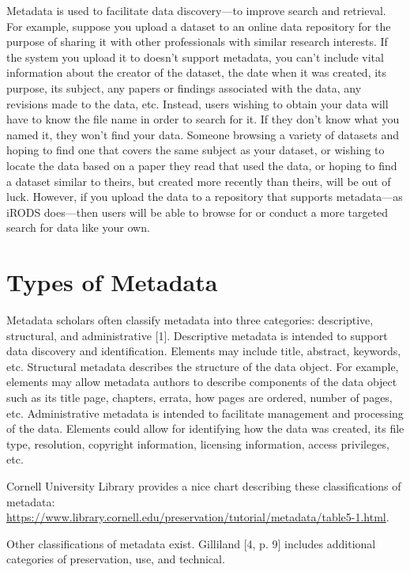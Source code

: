 \documentclass[10pt,oneside]{memoir}
\begin{document}
Metadata is used to facilitate data discovery---to improve search and retrieval. For example, suppose you upload a dataset to an online data repository for the purpose of sharing it with other professionals with similar research interests. If the system you upload it to doesn't support metadata, you can't include vital information about the creator of the dataset, the date when it was created, its purpose, its subject, any papers or findings associated with the data, any revisions made to the data, etc. Instead, users wishing to obtain your data will have to know the file name in order to search for it. If they don't know what you named it, they won't find your data. Someone browsing a variety of datasets and hoping to find one that covers the same subject as your dataset, or wishing to locate the data based on a paper they read that used the data, or hoping to find a dataset similar to theirs, but created more recently than theirs, will be out of luck. However, if you upload the data to a repository that supports metadata---as iRODS does---then users will be able to browse for or conduct a more targeted search for data like your own.

\section{Types of Metadata}

Metadata scholars often classify metadata into three categories: descriptive, structural, and administrative [1].
Descriptive metadata is intended to support data discovery and identification. Elements may include title, abstract, keywords, etc.
Structural metadata describes the structure of the data object. For example, elements may allow metadata authors to describe components of the data object such as its title page, chapters, errata, how pages are ordered, number of pages, etc.
Administrative metadata is intended to facilitate management and processing of the data.
Elements could allow for identifying how the data was created, its file type, resolution, copyright information, licensing information, access privileges, etc.

Cornell University Library provides a nice chart describing these classifications of metadata: \\ \url{https://www.library.cornell.edu/preservation/tutorial/metadata/table5-1.html}.

Other classifications of metadata exist. Gilliland [4, p. 9] includes additional categories of preservation, use, and technical.
\end{document}

